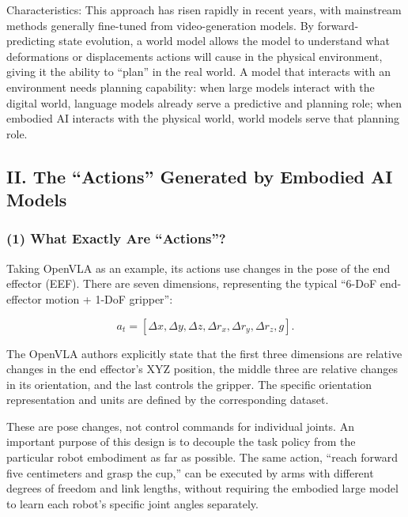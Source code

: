 Characteristics: This approach has risen rapidly in recent years, with mainstream methods generally fine-tuned from video-generation models. By forward-predicting state evolution, a world model allows the model to understand what deformations or displacements actions will cause in the physical environment, giving it the ability to ``plan'' in the real world. A model that interacts with an environment needs planning capability: when large models interact with the digital world, language models already serve a predictive and planning role; when embodied AI interacts with the physical world, world models serve that planning role.

\hypertarget{ii.-the-actions-generated-by-embodied-ai-models}{%
\subsection{II. The ``Actions'' Generated by Embodied AI Models}\label{ii.-the-actions-generated-by-embodied-ai-models}}

\hypertarget{what-exactly-are-actions}{%
\subsubsection{(1) What Exactly Are ``Actions''?}\label{what-exactly-are-actions}}

Taking OpenVLA as an example, its actions use changes in the pose of the end effector (EEF). There are seven dimensions, representing the typical ``6-DoF end-effector motion + 1-DoF gripper'':

\[
a_t=[\Delta x,\Delta y,\Delta z,\Delta r_x,\Delta r_y,\Delta r_z,g].
\]

The OpenVLA authors explicitly state that the first three dimensions are relative changes in the end effector's XYZ position, the middle three are relative changes in its orientation, and the last controls the gripper. The specific orientation representation and units are defined by the corresponding dataset.

These are pose changes, not control commands for individual joints. An important purpose of this design is to decouple the task policy from the particular robot embodiment as far as possible. The same action, ``reach forward five centimeters and grasp the cup,'' can be executed by arms with different degrees of freedom and link lengths, without requiring the embodied large model to learn each robot's specific joint angles separately.

